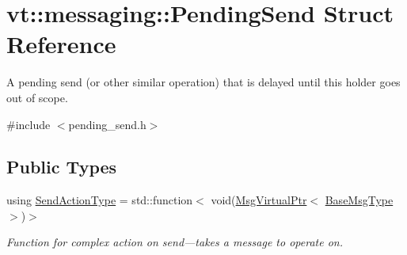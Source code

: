 \hypertarget{structvt_1_1messaging_1_1_pending_send}{}\section{vt\+:\+:messaging\+:\+:Pending\+Send Struct Reference}
\label{structvt_1_1messaging_1_1_pending_send}


A pending send (or other similar operation) that is delayed until this holder goes out of scope.  




{\ttfamily \#include $<$pending\+\_\+send.\+h$>$}

\subsection*{Public Types}
\begin{DoxyCompactItemize}
\item 
using \hyperlink{structvt_1_1messaging_1_1_pending_send_a758cf5a064cb5198b47e979c891fecd6}{Send\+Action\+Type} = std\+::function$<$ void(\hyperlink{namespacevt_a82b5c92ea7ca3ddd2e8a2e27df87fa1a}{Msg\+Virtual\+Ptr}$<$ \hyperlink{namespacevt_a44d0d4e144748f2b19a1cfd962f50338}{Base\+Msg\+Type} $>$)$>$
\begin{DoxyCompactList}\small\item\em Function for complex action on send---takes a message to operate on. \end{DoxyCompactList}\end{DoxyCompactItemize}
